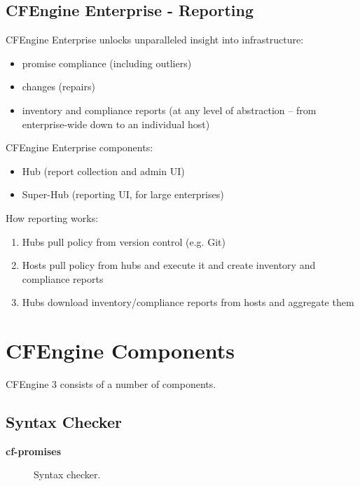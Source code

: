 \subsection{CFEngine Enterprise - Reporting}

CFEngine Enterprise unlocks unparalleled insight into infrastructure:

\begin{itemize}
\item{} promise compliance (including outliers)
\item{} changes (repairs)
\item{} inventory and compliance reports (at any level of abstraction -- from
enterprise-wide down to an individual host)
\end{itemize}

CFEngine Enterprise components:

\begin{itemize}
\item{} Hub (report collection and admin UI)
\item{} Super-Hub (reporting UI, for large enterprises)
\end{itemize}

How reporting works:

\begin{enumerate}
\item{} Hubs pull policy from version control (e.g. Git)
\item{} Hosts pull policy from hubs and execute it and create inventory and
compliance reports
\item{} Hubs download inventory/compliance reports from hosts and aggregate them
\end{enumerate}





\section{CFEngine Components}

CFEngine 3 consists of a number of components.





\subsection{Syntax Checker}

\begin{description}
\item[\textbf{cf-promises}] Syntax checker.
\end{description}

